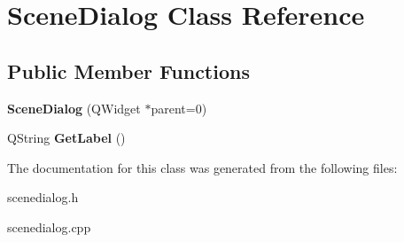 \hypertarget{classSceneDialog}{\section{Scene\-Dialog Class Reference}
\label{classSceneDialog}
}
\subsection*{Public Member Functions}
\begin{DoxyCompactItemize}
\item 
\hypertarget{classSceneDialog_a48fbdf6f9f4080a23380655b416989ee}{{\bfseries Scene\-Dialog} (Q\-Widget $\ast$parent=0)}\label{classSceneDialog_a48fbdf6f9f4080a23380655b416989ee}

\item 
\hypertarget{classSceneDialog_aa9fd8578cfafda5d6ed73cb2e82ad64d}{Q\-String {\bfseries Get\-Label} ()}\label{classSceneDialog_aa9fd8578cfafda5d6ed73cb2e82ad64d}

\end{DoxyCompactItemize}


The documentation for this class was generated from the following files\-:\begin{DoxyCompactItemize}
\item 
scenedialog.\-h\item 
scenedialog.\-cpp\end{DoxyCompactItemize}
